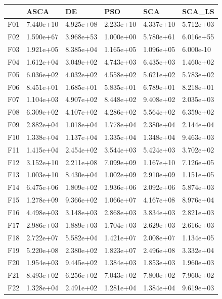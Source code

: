 \begin{tabular}{llllll}
\toprule
{} &       ASCA &         DE &        PSO &        SCA &     SCA\_LS \\
\midrule
F01  &  7.440e+10 &  4.925e+08 &  2.233e+10 &  4.337e+10 &  5.712e+03 \\
F02  &  1.590e+67 &  3.968e+53 &  1.000e+00 &  5.780e+61 &  6.016e+55 \\
F03  &  1.921e+05 &  8.385e+04 &  1.165e+05 &  1.096e+05 &  6.000e-10 \\
F04  &  1.612e+04 &  3.049e+02 &  4.743e+03 &  6.435e+03 &  1.460e+02 \\
F05  &  6.036e+02 &  4.032e+02 &  4.558e+02 &  5.621e+02 &  5.783e+02 \\
F06  &  8.451e+01 &  1.685e+01 &  5.835e+01 &  6.789e+01 &  8.218e+01 \\
F07  &  1.104e+03 &  4.907e+02 &  8.448e+02 &  9.408e+02 &  2.035e+03 \\
F08  &  6.309e+02 &  4.107e+02 &  4.286e+02 &  5.564e+02 &  6.359e+02 \\
F09  &  2.882e+04 &  1.018e+04 &  1.778e+04 &  2.380e+04 &  2.144e+04 \\
F10  &  1.338e+04 &  1.137e+04 &  1.335e+04 &  1.348e+04 &  9.463e+03 \\
F11  &  1.415e+04 &  2.454e+02 &  3.544e+03 &  5.424e+03 &  3.702e+02 \\
F12  &  3.152e+10 &  2.211e+08 &  7.099e+09 &  1.167e+10 &  7.126e+05 \\
F13  &  1.003e+10 &  8.430e+04 &  1.002e+09 &  2.910e+09 &  1.151e+05 \\
F14  &  6.475e+06 &  1.809e+02 &  1.936e+06 &  2.092e+06 &  5.874e+03 \\
F15  &  1.278e+09 &  9.366e+02 &  1.066e+07 &  4.167e+08 &  8.976e+04 \\
F16  &  4.498e+03 &  3.148e+03 &  2.868e+03 &  3.834e+03 &  2.821e+03 \\
F17  &  2.986e+03 &  1.889e+03 &  1.704e+03 &  2.629e+03 &  2.616e+03 \\
F18  &  2.722e+07 &  5.582e+04 &  1.421e+07 &  2.008e+07 &  1.134e+05 \\
F19  &  5.220e+08 &  2.380e+02 &  1.823e+07 &  2.496e+08 &  3.332e+04 \\
F20  &  1.954e+03 &  9.445e+02 &  1.384e+03 &  1.853e+03 &  1.960e+03 \\
F21  &  8.493e+02 &  6.256e+02 &  7.043e+02 &  7.800e+02 &  7.960e+02 \\
F22  &  1.328e+04 &  2.491e+02 &  1.281e+04 &  1.384e+04 &  9.619e+03 \\

\end{tabular}
